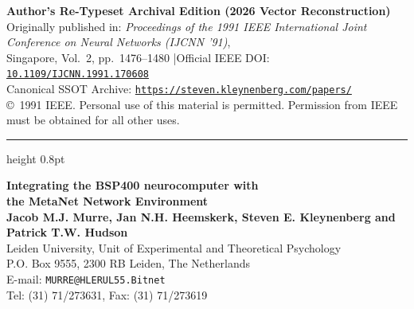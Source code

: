 \documentclass[11pt, a4paper]{article}
\begin{document}
\begin{center}
{\small\color{slatemuted}
\textbf{Author's Re-Typeset Archival Edition (2026 Vector Reconstruction)}\\[2pt]
Originally published in: \textit{Proceedings of the 1991 IEEE International Joint Conference on Neural Networks (IJCNN '91)},\\
Singapore, Vol.~2, pp.~1476--1480 \quad|\quad Official IEEE DOI: \href{https://doi.org/10.1109/IJCNN.1991.170608}{\texttt{10.1109/IJCNN.1991.170608}}\\[2pt]
Canonical SSOT Archive: \href{https://steven.kleynenberg.com/papers/}{\texttt{https://steven.kleynenberg.com/papers/}}\\[2pt]
{\footnotesize \copyright~1991 IEEE. Personal use of this material is permitted. Permission from IEEE must be obtained for all other uses.}
}
\end{center}

\vspace{2pt}
{\color{rulegray}\hrule height 0.8pt}
\vspace{10pt}

\begin{center}
{\LARGE\bfseries\color{navyaccent} Integrating the BSP400 neurocomputer with\\[3pt] the MetaNet Network Environment}\\[10pt]
{\large\bfseries Jacob M.J. Murre, Jan N.H. Heemskerk, Steven E. Kleynenberg and Patrick T.W. Hudson}\\[4pt]
{\normalsize Leiden University, Unit of Experimental and Theoretical Psychology\\
P.O. Box 9555, 2300 RB Leiden, The Netherlands\\
E-mail: \texttt{MURRE@HLERUL55.Bitnet}\\
Tel: (31) 71/273631, Fax: (31) 71/273619}
\end{center}

\vspace{6pt}
\end{document}

